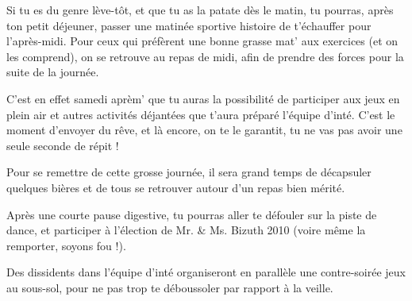 Si tu es du genre lève-tôt, et que tu as la patate dès le matin, tu pourras,
après ton petit déjeuner, passer une matinée sportive histoire de
t'échauffer pour l'après-midi. Pour ceux qui préfèrent une bonne grasse
mat' aux exercices (et on les comprend), on se retrouve au repas de midi, afin de
prendre des forces pour la suite de la journée.

\vspace{1em}

C'est en effet samedi aprèm' que tu auras la possibilité de participer aux
jeux en plein air et autres activités déjantées que t'aura préparé l'équipe d'inté. C'est
le moment d'envoyer du rêve, et là encore, on te le garantit, tu ne
vas pas avoir une seule seconde de répit !

\vspace{1em}

Pour se remettre de cette grosse journée, il sera grand temps de décapsuler
quelques bières et de tous se retrouver autour d'un repas bien mérité.

\vspace{1em}

Après une courte pause digestive, tu pourras aller te défouler sur la piste de
dance, et participer à l'élection de Mr. \& Ms. Bizuth 2010 (voire même la remporter, soyons fou !).

\vspace{1em}

Des dissidents dans l'équipe d'inté organiseront en parallèle une contre-soirée jeux au
sous-sol, pour ne pas trop te déboussoler par rapport à la veille.
